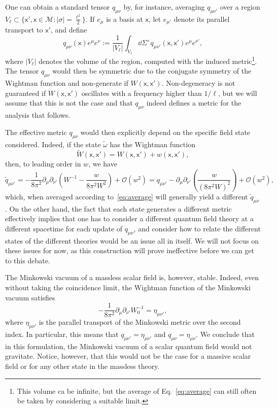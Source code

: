\documentclass[letterpaper,12pt,titlepage,oneside,final]{book}
\newcommand{\M}{\mathcal{M}}
\newcommand{\mf}{\mathsf}%
\begin{document}
One can obtain a standard tensor $q_{\mu\nu}$ by, for instance, averaging $q_{\mu\nu'}$ over a region $V_{\ell} \subset \{\mf x', \mf x\in \M:|\sigma| = \tfrac{\ell^2}{2}\}$. If $e_{\mu}$ is a basis at $\mf x$, let $e_{\mu'}$ denote its parallel transport to $\mf x'$, and define
\begin{equation}\label{eq:average}
    q_{\mu\nu}(\mf x)e^\mu e^{\nu} := \frac{1}{|V_{\ell}|}\int_{V_\ell} \dd\Sigma'\, q_{\mu\nu'}(\mf x, \mf x')e^\mu e^{\nu'},
\end{equation}
where $|V_\ell|$ denotes the volume of the region, computed with the induced metric\footnote{This volume ca be infinite, but the average of Eq.~\eqref{eq:average} can still often be taken by considering a suitable limit.}. The tensor $q_{\mu\nu}$ would then be symmetric due to the conjugate symmetry of the Wightman function and non-generate if $W(\mf x, \mf x')$. Non-degeneracy is not guaranteed if $W(\mf x, \mf x')$ oscillates with a frequency higher than $1/\ell$, but we will assume that this is not the case and that $q_{\mu\nu}$ indeed defines a metric for the analysis that follows.

The effective metric $q_{\mu\nu}$ would then explicitly depend on the specific field state considered. Indeed, if the state $\tilde{\omega}$ has the Wightman function 
\begin{equation}
    \tilde{W}(\mf x, \mf x') = W(\mf x, \mf x') + w(\mf x, \mf x'),
\end{equation}
then, to leading order in $w$, we have
\begin{equation}
    \tilde{q}_{\mu\nu'} = - \frac{1}{8\pi^2}\partial_\mu \partial_{\nu'} \left(W^{-1} - \frac{w}{8 \pi^2W^2}\right) + \mathcal{O}(w^2)= q_{\mu\nu'} - \partial_\mu \partial_{\nu'} \left(\frac{w}{(8 \pi^2 W)^2}\right)  + \mathcal{O}(w^2),
\end{equation}
which, when averaged according to~\eqref{eq:average} will generally yield a different $\tilde{q}_{\mu\nu}$. On the other hand, the fact that each state generates a different metric effectively implies that one has to consider a different quantum field theory at a different spacetime for each update of $q_{\mu\nu}$, and consider how to relate the different states of the different theories would be an issue all in itself. We will not focus on these issues for now, as this construction will prove ineffective before we can get to this debate.

The Minkowski vacuum of a massless scalar field is, however, stable. Indeed, even without taking the coincidence limit, the Wightman function of the Minkowski vacuum satisfies
\begin{equation}
     - \frac{1}{8\pi^2}\partial_\mu \partial_{\nu'}W_0^{-1} = \eta_{\mu\nu'}, 
\end{equation}
where $\eta_{\mu\nu'}$ is the parallel transport of the Minkowski metric over the second index. In particular, this means that $q_{\mu\nu'} = \eta_{\mu\nu'}$ and $q_{\mu\nu} = \eta_{\mu\nu}$. We conclude that in this formulation, the Minkowski vacuum of a scalar quantum field would not gravitate. Notice, however, that this would not be the case for a massive scalar field or for any other state in the massless theory.
\end{document}

